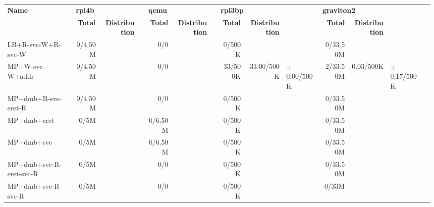 \begin{tabular}{l  | r r l | r r l | r r l | r r l l}
   \textbf{Name}           & \multicolumn{3}{l}{\textbf{rpi4b}}                       & \multicolumn{3}{l}{\textbf{qemu}}        & \multicolumn{3}{l}{\textbf{rpi3bp}}                       & \multicolumn{3}{l}{\textbf{graviton2}}                       & \\
                           & \textbf{Total} & \textbf{Distribution} &                 & \textbf{Total} & \textbf{Distribution} &  & \textbf{Total} & \textbf{Distribution} &                 & \textbf{Total} & \textbf{Distribution} &                 & \\
        LB+R-svc-W+R-svc-W &        0/4.50M &                       &                 &            0/0 &                       &  &         0/500K &                       &                 &       0/33.50M &                       &                 & \\ \hline 
           MP+W-svc-W+addr &        0/4.50M &                       &                 &            0/0 &                       &  &        33/500K &            33.00/500K & $\pm$ 0.00/500K &       2/33.50M &             0.03/500K & $\pm$ 0.17/500K & \\ \hline 
       MP+dmb+R-svc-eret-R &        0/4.50M &                       &                 &            0/0 &                       &  &         0/500K &                       &                 &       0/33.50M &                       &                 & \\ \hline 
               MP+dmb+eret &           0/5M &                       &                 &        0/6.50M &                       &  &         0/500K &                       &                 &       0/33.50M &                       &                 & \\ \hline 
                MP+dmb+svc &           0/5M &                       &                 &        0/6.50M &                       &  &         0/500K &                       &                 &       0/33.50M &                       &                 & \\ \hline 
   MP+dmb+svc-R-eret-svc-R &           0/5M &                       &                 &            0/0 &                       &  &         0/500K &                       &                 &       0/33.50M &                       &                 & \\ \hline 
        MP+dmb+svc-R-svc-R &           0/5M &                       &                 &            0/0 &                       &  &         0/500K &                       &                 &          0/33M &                       &                 & \\ \hline 

\end{tabular}
